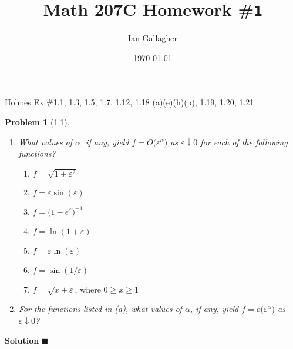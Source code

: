 \documentclass[11pt]{article}
\title{Math 207C Homework \#\texttt{1}}
\author{Ian Gallagher}
\date{\today}
\theoremstyle{problemstyle}
\newtheorem{problem}{Problem}
\newenvironment{solution}
  {\noindent\textbf{Solution}\quad}
  {\hfill$\blacksquare$\par\vspace{1em}}
\begin{document}
\maketitle

\noindent Holmes Ex \#1.1, 1.3, 1.5, 1.7, 1.12, 1.18 (a)(e)(h)(p), 1.19, 1.20, 1.21

\begin{problem}[1.1]
\mbox{} %
\begin{enumerate}
  \item What values of $\alpha$, if any, yield 
        \(
        f = O\bigl(\varepsilon^\alpha\bigr)
        \)
        as $\varepsilon \downarrow 0$ for each of the following functions?
\begin{multicols}{2}
  \begin{enumerate}
    \item $f = \sqrt{1 + \varepsilon^2}$ 
    \item $f = \varepsilon \sin(\varepsilon)$ 
    \item $f = \bigl(1 - e^\varepsilon)^{-1}$
    \item $f = \ln(1 + \varepsilon)$
    \item $f = \varepsilon \ln(\varepsilon)$
    \item $f = \sin(1 / \varepsilon)$
    \item $f = \sqrt{x + \varepsilon}\text{, where } 0 \geq x \geq 1$ \newline\mbox{}
  \end{enumerate}
\end{multicols}
\item For the functions listed in (a), what values of $\alpha$, if any, yield
      \(
      f = o\bigl(\varepsilon^\alpha\bigr)
      \)
      as $\varepsilon \downarrow 0$?
\end{enumerate}
\end{problem}

\begin{solution}
\end{solution}
\end{document}
